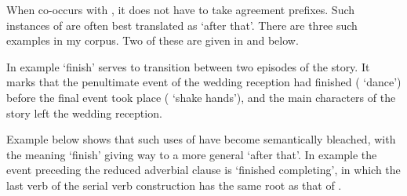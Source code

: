 When  co-occurs with ,
it does not have to take agreement prefixes.
Such instances of 
are often best translated as `after that'.
There are three such examples in my corpus.
Two of these are given in  and  below.

In example   `finish'
serves to transition between two episodes of the story.
It marks that the penultimate event of the wedding reception
had finished ( `dance')
before the final event took place ( `shake hands'),
and the main characters of the story left the wedding reception.

\begin{exe}
	\label{ex:130902-1, 3.23-3.28}
		\begin{xlist}
		\end{xlist}
\end{exe}

Example  below shows that such uses of 
have become semantically bleached, with the meaning `finish'
giving way to a more general `after that'.
In example  the event preceding
the reduced adverbial clause is  `finished completing',
in which the last verb of the serial verb construction
has the same root as that of .

